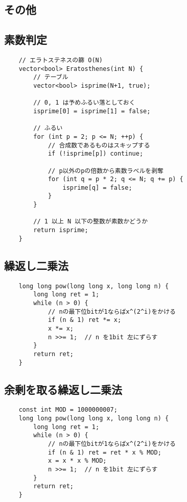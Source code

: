 \documentclass[a4paper, landscape, 9pt]{jarticle} %
\begin{document}
\begin{multicols*}{3}
    \section{その他}
    \subsection{素数判定}
    \begin{lstlisting}
    // エラトステネスの篩 O(N)
    vector<bool> Eratosthenes(int N) {
        // テーブル
        vector<bool> isprime(N+1, true);
    
        // 0, 1 は予めふるい落としておく
        isprime[0] = isprime[1] = false;
    
        // ふるい
        for (int p = 2; p <= N; ++p) {
            // 合成数であるものはスキップする
            if (!isprime[p]) continue;
    
            // p以外のpの倍数から素数ラベルを剥奪
            for (int q = p * 2; q <= N; q += p) {
                isprime[q] = false;
            }
        }
    
        // 1 以上 N 以下の整数が素数かどうか
        return isprime;
    }
    \end{lstlisting}

    \subsection{繰返し二乗法}
    \begin{lstlisting}
    long long pow(long long x, long long n) {
        long long ret = 1;
        while (n > 0) {
            // nの最下位bitが1ならばx^(2^i)をかける
            if (n & 1) ret *= x;  
            x *= x;
            n >>= 1;  // n を1bit 左にずらす
        }
        return ret;
    }
    \end{lstlisting}

    \subsection{余剰を取る繰返し二乗法}
    \begin{lstlisting}
    const int MOD = 1000000007;
    long long pow(long long x, long long n) {
        long long ret = 1;
        while (n > 0) {
            // nの最下位bitが1ならばx^(2^i)をかける
            if (n & 1) ret = ret * x % MOD;  
            x = x * x % MOD;
            n >>= 1;  // n を1bit 左にずらす
        }
        return ret;
    }
    \end{lstlisting}


\end{multicols*}
\end{document}
